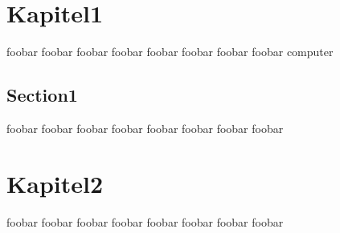 \chapter{Kapitel1}
\label{cha:Kapitel1}
foobar foobar foobar foobar foobar foobar foobar foobar
\gls{computer}
\section{Section1}
\label{cha:Section1}
foobar foobar foobar foobar foobar foobar foobar foobar
\chapter{Kapitel2}
foobar foobar foobar foobar foobar foobar foobar foobar
